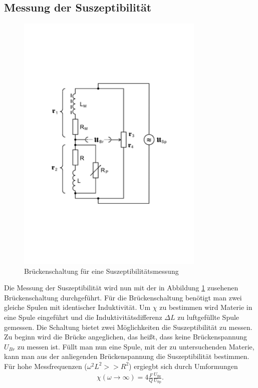 \subsection{Messung der Suszeptibilität}
\begin{figure}[h!]
  \centering
  \includegraphics[width=0.8\textwidth]{606schaltung.pdf}
  \caption{Brückenschaltung für eine Suszeptibilitätsmessung \cite{1}}
  \label{fig:schalt}
\end{figure}
Die Messung der Suszeptibilität wird nun mit der in Abbildung \ref{fig:schalt} zusehenen Brückenschaltung durchgeführt.
Für die Brückenschaltung benötigt man zwei gleiche Spulen mit identischer Induktivität. Um $\chi$ zu bestimmen wird Materie in eine Spule eingeführt und die Induktivitätsdifferenz $\Delta L$ zu luftgefüllte Spule gemessen.
Die Schaltung bietet zwei Möglichkeiten die Suszeptibilität zu messen.
Zu beginn wird die Brücke angeglichen, das heißt, dass keine Brückenspannung $U_{Br}$ zu messen ist.
Füllt man nun eine Spule, mit der zu untersuchenden Materie, kann man aus der anliegenden Brückenspannung die Suszeptibilität bestimmen.
Für hohe Messfrequenzen ($\omega^2L^2>>R^2$) ergiegbt sich durch Umformungen
\begin{align}
  \chi(\omega\to\infty)=4\frac{F}{Q}\frac{U_{\text{Br}}}{U_{\text{Sp}}}.
  \label{eqn:suszU}
\end{align}
